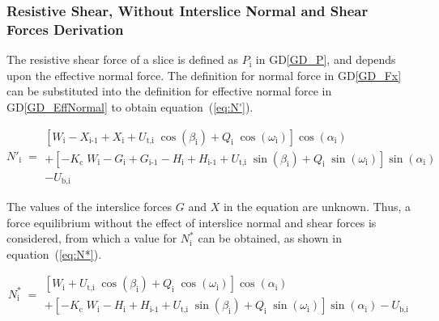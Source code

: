 \documentclass[12pt]{article}
\newcommand{\dref}[1]{GD\ref{#1}}
\begin{document}

\subsubsection*{Resistive Shear, Without Interslice Normal and Shear Forces 
Derivation}

\noindent
The resistive shear force of a slice is defined as $P_\text{i}$ in
\dref{GD_P}, and depends upon the effective normal force.  The definition for 
normal force in \dref{GD_Fx} can be substituted into the definition for 
effective normal force in \dref{GD_EffNormal} to obtain equation~(\ref{eq:N'}).

\begin{equation} \label{eq:N'}
 N'_{\text{i}} \; = \begin{array}{l}
   \left[ W_{\text{i}} - X_{\text{i-1}} + X_{\text{i}} +
     {U_{\text{t,i}}}\;{\cos\left(\beta_{\text{i}}\right)} +
     Q_{\text{i}}\;{\cos\left(\omega_{\text{i}}\right)}
     \right]\cos\left(\alpha_{\text{i}}\right) \\ + \left[
     {-K_{\text{c}}}\;{W_{\text{i}}} - G_{\text{i}} + G_{\text{i-1}} -
     H_{\text{i}} + H_{\text{i-1}} +
     {U_{\text{t,i}}}\;{\sin\left(\beta_{\text{i}}\right)} +
     Q_{\text{i}}\;{\sin\left(\omega_{\text{i}}\right)}
     \right]\sin\left(\alpha_{\text{i}}\right) \\ -
   U_{\text{b,i}} \end{array}
 \end{equation}

\noindent
The values of the interslice forces $G$ and $X$ in the equation are
unknown. Thus, a force equilibrium without the effect of interslice normal and 
shear forces is considered, from which a value for $N^*_\text{i}$ can be 
obtained, as shown in equation~(\ref{eq:N*}).

\begin{equation} \label{eq:N*}
 N^*_{\text{i}} \; = \begin{array}{l}
   \left[ W_{\text{i}} +
     {U_{\text{t,i}}}\;{\cos\left(\beta_{\text{i}}\right)} +
     Q_{\text{i}}\;{\cos\left(\omega_{\text{i}}\right)}
     \right]\cos\left(\alpha_{\text{i}}\right) \\ + \left[
     {-K_{\text{c}}}\;{W_{\text{i}}}- H_{\text{i}} + H_{\text{i-1}} +
     {U_{\text{t,i}}}\;{\sin\left(\beta_{\text{i}}\right)} +
     Q_{\text{i}}\;{\sin\left(\omega_{\text{i}}\right)}
     \right]\sin\left(\alpha_{\text{i}}\right) -
   U_{\text{b,i}} \end{array}
\end{equation}
\end{document}
